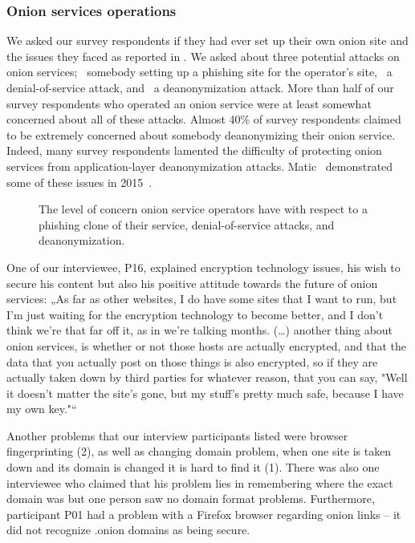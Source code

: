 \subsubsection{Onion services operations}
We asked our survey respondents if they had ever set up their own onion site and the issues they faced as reported in .  We asked about three potential attacks on onion services; \first~somebody setting up a
phishing site for the operator's site, \second~a denial-of-service attack, and
\third~a deanonymization attack.  More than half of our survey respondents who operated an onion service were at least
somewhat concerned about all of these attacks.  Almost 40\% of survey respondents claimed to be
extremely concerned about somebody deanonymizing their onion service.  Indeed,
many survey respondents lamented the difficulty of protecting onion services from
application-layer deanonymization attacks.  Matic \ea\ demonstrated some of
these issues in 2015~\cite{Matic2015a}.

\begin{figure}[t]
    \centering
    
    \caption{The level of concern onion service operators have with respect to a
    phishing clone of their service, denial-of-service attacks, and
    deanonymization.}
    \label{fig:onion-operation-concerns}
\end{figure}

One of our interviewee, P16, explained encryption technology issues, his wish to secure his content but also his positive attitude towards the future of onion services: „As far as other websites, I do have some sites that I want to run, but I'm just waiting for the encryption technology to become better, and I don't think we're that far off it, as in we're talking months. (…) another thing about onion services, is whether or not those hosts are actually encrypted, and that the data that you actually post on those things is also encrypted, so if they are actually taken down by third parties for whatever reason, that you can say, "Well it doesn't matter the site's gone, but my stuff's pretty much safe, because I have my own key."“

Another problems that our interview participants listed were browser fingerprinting (2), as well as changing domain problem, when one site is taken down and its domain is changed it is hard to find it (1). There was also one interviewee who claimed that his problem lies in remembering where the exact domain was but one person saw no domain format problems. Furthermore, participant P01 had a problem with a Firefox  browser regarding onion links – it did not recognize .onion domains as being secure. 

